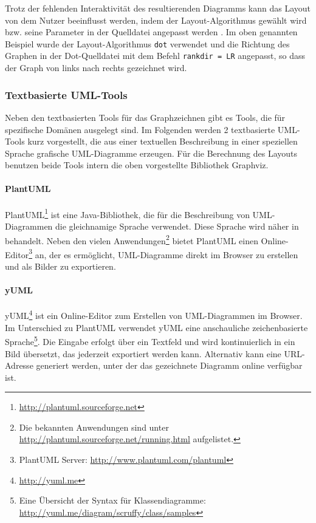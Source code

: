 Trotz der fehlenden Interaktivität des resultierenden Diagramms kann das Layout von dem Nutzer beeinflusst werden, indem der Layout-Algorithmus gewählt wird bzw. seine Parameter in der Quelldatei angepasst werden \cite{NorthGansner14Dot-Manual}. Im oben genannten Beispiel wurde der Layout-Algorithmus \lstinline{dot} verwendet und die Richtung des Graphen in der Dot-Quelldatei mit dem Befehl \lstinline{rankdir = LR} angepasst, so dass der Graph von links nach rechts gezeichnet wird.

\subsubsection{Textbasierte UML-Tools}

Neben den textbasierten Tools für das Graphzeichnen gibt es Tools, die für spezifische Domänen ausgelegt sind. Im Folgenden werden 2 textbasierte UML-Tools kurz vorgestellt, die aus einer textuellen Beschreibung in einer speziellen Sprache grafische UML-Diagramme erzeugen. Für die Berechnung des Layouts benutzen beide Tools intern die oben vorgestellte Bibliothek Graphviz.

\paragraph{PlantUML}


PlantUML\footnote{\url{http://plantuml.sourceforge.net}} ist eine Java-Bibliothek, die für die Beschreibung von UML-Diagrammen die gleichnamige Sprache verwendet. Diese Sprache wird näher in \cite{Roques10Drawing} behandelt. Neben den vielen Anwendungen\footnote{Die bekannten Anwendungen sind unter \url{http://plantuml.sourceforge.net/running.html} aufgelistet.} bietet PlantUML einen Online-Editor\footnote{PlantUML Server: \url{http://www.plantuml.com/plantuml}} an, der es ermöglicht, UML-Diagramme direkt im Browser zu erstellen und als Bilder zu exportieren.

\paragraph{yUML}

yUML\footnote{\url{http://yuml.me}} ist ein Online-Editor zum Erstellen von UML-Diagrammen im Browser. Im Unterschied zu PlantUML verwendet yUML eine anschauliche zeichenbasierte Sprache\footnote{Eine Übersicht der Syntax für Klassendiagramme: \url{http://yuml.me/diagram/scruffy/class/samples}}. Die Eingabe erfolgt über ein Textfeld und wird kontinuierlich in ein Bild übersetzt, das jederzeit exportiert werden kann. Alternativ kann eine URL-Adresse generiert \cite{Fuhrmann11On-the-Pragmatics} werden, unter der das gezeichnete Diagramm online verfügbar ist.

